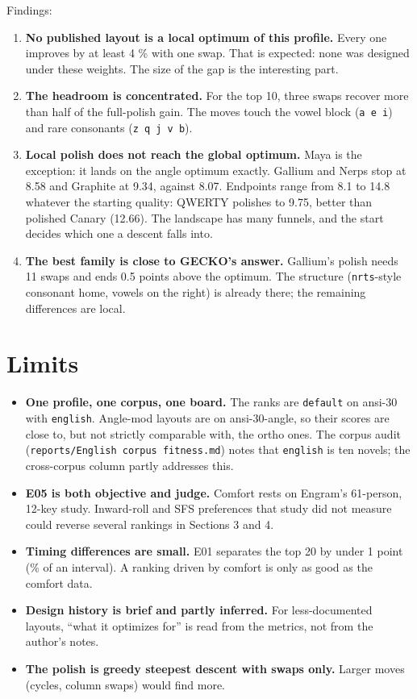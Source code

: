 \documentclass{gecko-paper}
\newcounter{none}
\begin{document}
{Findings:

\begin{enumerate}
\def\labelenumi{\arabic{enumi}.}
\setlength{\itemsep}{1pt}\setlength{\parskip}{0pt}
\item
  \textbf{No published layout is a local optimum of this profile.} Every one improves by at least 4 \% with one swap. That is expected: none was designed under these weights. The size of the gap is the interesting part.
\item
  \textbf{The headroom is concentrated.} For the top 10, three swaps recover more than half of the full-polish gain. The moves touch the vowel block (\texttt{a\ e\ i}) and rare consonants (\texttt{z\ q\ j\ v\ b}).
\item
  \textbf{Local polish does not reach the global optimum.} Maya is the exception: it lands on the angle optimum exactly. Gallium and Nerps stop at 8.58 and Graphite at 9.34, against 8.07. Endpoints range from 8.1 to 14.8 whatever the starting quality: QWERTY polishes to 9.75, better than polished Canary (12.66). The landscape has many funnels, and the start decides which one a descent falls into.
\item
  \textbf{The best family is close to GECKO's answer.} Gallium's polish needs 11 swaps and ends 0.5 points above the optimum. The structure (\texttt{nrts}-style consonant home, vowels on the right) is already there; the remaining differences are local.
\end{enumerate}

\section{Limits}

\begin{itemize}
\setlength{\itemsep}{1pt}\setlength{\parskip}{0pt}
\item
  \textbf{One profile, one corpus, one board.} The ranks are \texttt{default} on ansi-30 with \texttt{english}. Angle-mod layouts are on ansi-30-angle, so their scores are close to, but not strictly comparable with, the ortho ones. The corpus audit (\texttt{reports/English\ corpus\ fitness.md}) notes that \texttt{english} is ten novels; the cross-corpus column partly addresses this.
\item
  \textbf{E05 is both objective and judge.} Comfort rests on Engram's 61-person, 12-key study. Inward-roll and SFS preferences that study did not measure could reverse several rankings in Sections 3 and 4.
\item
  \textbf{Timing differences are small.} E01 separates the top 20 by under 1 point (\% of an interval). A ranking driven by comfort is only as good as the comfort data.
\item
  \textbf{Design history is brief and partly inferred.} For less-documented layouts, “what it optimizes for” is read from the metrics, not from the author's notes.
\item
  \textbf{The polish is greedy steepest descent with swaps only.} Larger moves (cycles, column swaps) would find more.
\end{itemize}

}
\end{document}
